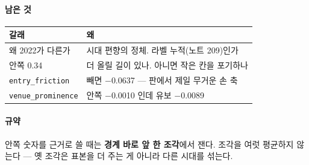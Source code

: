\documentclass[10pt]{article}
\begin{document}
\paragraph{남은 것}
\begin{center}\small
\begin{tabular}{ll}
\hline
갈래 & 왜 \\
\hline
왜 2022가 다른가 & 시대 편향의 정체. 라벨 누적(노트 209)인가 \\
안쪽 0.34 & 더 올릴 길이 있나. 아니면 작은 칸을 포기하나 \\
\texttt{entry\_friction} & 빼면 $-$0.0637 --- 판에서 제일 무거운 손 축 \\
\texttt{venue\_prominence} & 안쪽 $-$0.0010 인데 유보 $-$0.0089 \\
\hline
\end{tabular}
\end{center}

\paragraph{규약} 안쪽 숫자를 근거로 쓸 때는 \textbf{경계 바로 앞 한 조각}에서
잰다. 조각을 여럿 평균하지 않는다 --- 옛 조각은 표본을 더 주는 게 아니라
다른 시대를 섞는다.
\end{document}
